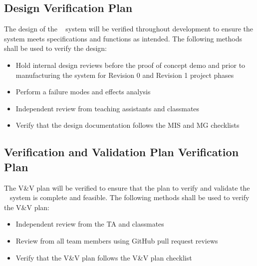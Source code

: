 \documentclass[12pt, titlepage]{article}
\begin{document}
\subsection{Design Verification Plan}



The design of the \progname~ system will be verified throughout development to ensure the system meets specifications and functions as intended. The following methods shall be used to verify the design:

\begin{itemize}
  \item Hold internal design reviews before the proof of concept demo and prior to manufacturing the system for Revision 0 and Revision 1 project phases
  \item Perform a failure modes and effects analysis
  \item Independent review from teaching assistants and classmates
  \item Verify that the design documentation follows the MIS \cite{Checklist-MIS} and MG \cite{checklist-MG} checklists
\end{itemize}

\subsection{Verification and Validation Plan Verification Plan}




The V\&V plan will be verified to ensure that the plan to verify and validate the \progname~ system is complete and feasible. The following methods shall be used to verify the V\&V plan:

\begin{itemize}
  \item Independent review from the TA and classmates
  \item Review from all team members using GitHub pull request reviews
    \item Verify that the V\&V plan follows the V\&V plan checklist \cite{Checklist-VnV}
\end{itemize}
\end{document}
